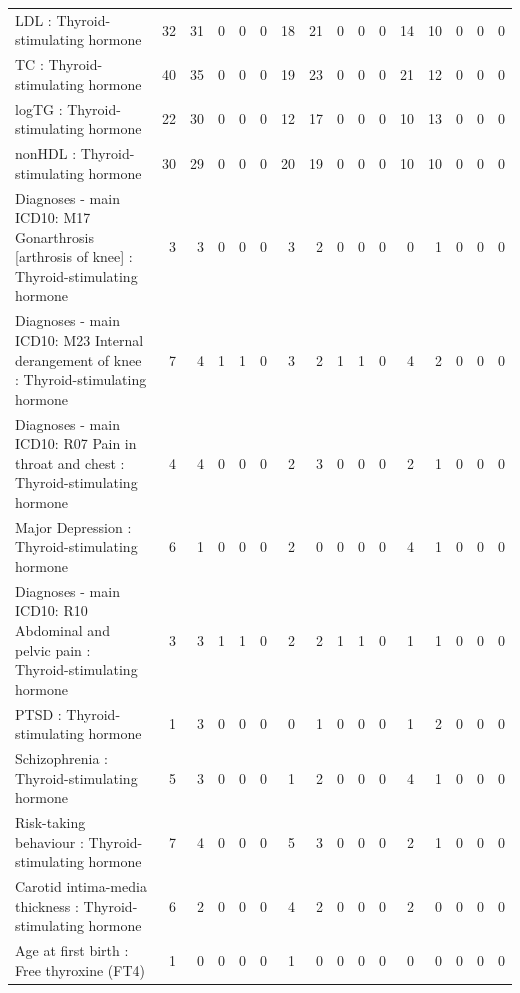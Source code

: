 \begin{table}[ht]
\begin{tabular}{lrrrrrrrrrrrrrrr}
  LDL : Thyroid-stimulating hormone  &  32 &  31 &   0 &   0 &   0 &  18 &  21 &   0 &   0 &   0 &  14 &  10 &   0 &   0 &   0 \\ 
  TC : Thyroid-stimulating hormone  &  40 &  35 &   0 &   0 &   0 &  19 &  23 &   0 &   0 &   0 &  21 &  12 &   0 &   0 &   0 \\ 
  logTG : Thyroid-stimulating hormone  &  22 &  30 &   0 &   0 &   0 &  12 &  17 &   0 &   0 &   0 &  10 &  13 &   0 &   0 &   0 \\ 
  nonHDL : Thyroid-stimulating hormone  &  30 &  29 &   0 &   0 &   0 &  20 &  19 &   0 &   0 &   0 &  10 &  10 &   0 &   0 &   0 \\ 
  Diagnoses - main ICD10: M17 Gonarthrosis [arthrosis of knee] : Thyroid-stimulating hormone  &   3 &   3 &   0 &   0 &   0 &   3 &   2 &   0 &   0 &   0 &   0 &   1 &   0 &   0 &   0 \\ 
  Diagnoses - main ICD10: M23 Internal derangement of knee : Thyroid-stimulating hormone  &   7 &   4 &   1 &   1 &   0 &   3 &   2 &   1 &   1 &   0 &   4 &   2 &   0 &   0 &   0 \\ 
  Diagnoses - main ICD10: R07 Pain in throat and chest : Thyroid-stimulating hormone  &   4 &   4 &   0 &   0 &   0 &   2 &   3 &   0 &   0 &   0 &   2 &   1 &   0 &   0 &   0 \\ 
  Major Depression : Thyroid-stimulating hormone  &   6 &   1 &   0 &   0 &   0 &   2 &   0 &   0 &   0 &   0 &   4 &   1 &   0 &   0 &   0 \\ 
  Diagnoses - main ICD10: R10 Abdominal and pelvic pain : Thyroid-stimulating hormone  &   3 &   3 &   1 &   1 &   0 &   2 &   2 &   1 &   1 &   0 &   1 &   1 &   0 &   0 &   0 \\ 
  PTSD : Thyroid-stimulating hormone  &   1 &   3 &   0 &   0 &   0 &   0 &   1 &   0 &   0 &   0 &   1 &   2 &   0 &   0 &   0 \\ 
  Schizophrenia : Thyroid-stimulating hormone  &   5 &   3 &   0 &   0 &   0 &   1 &   2 &   0 &   0 &   0 &   4 &   1 &   0 &   0 &   0 \\ 
  Risk-taking behaviour : Thyroid-stimulating hormone  &   7 &   4 &   0 &   0 &   0 &   5 &   3 &   0 &   0 &   0 &   2 &   1 &   0 &   0 &   0 \\ 
  Carotid intima-media thickness : Thyroid-stimulating hormone  &   6 &   2 &   0 &   0 &   0 &   4 &   2 &   0 &   0 &   0 &   2 &   0 &   0 &   0 &   0 \\ 
  Age at first birth  : Free thyroxine (FT4) &   1 &   0 &   0 &   0 &   0 &   1 &   0 &   0 &   0 &   0 &   0 &   0 &   0 &   0 &   0 \\ 

\end{tabular}
\end{table}
